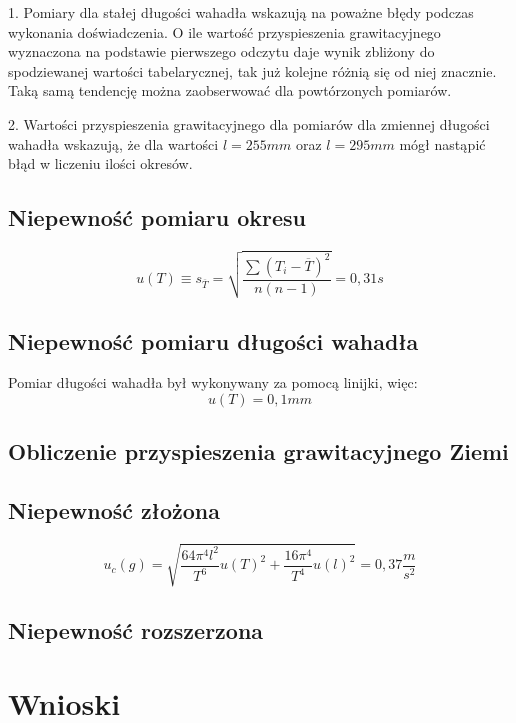 \documentclass[a4paper,10pt,twoside]{article}
\begin{document}
1. Pomiary dla stałej długości wahadła wskazują na poważne błędy podczas wykonania doświadczenia. O ile wartość przyspieszenia grawitacyjnego wyznaczona na podstawie pierwszego odczytu daje wynik zbliżony do spodziewanej wartości tabelarycznej, tak już kolejne różnią się od niej znacznie. Taką samą tendencję można zaobserwować dla powtórzonych pomiarów.

2. Wartości przyspieszenia grawitacyjnego dla pomiarów dla zmiennej długości wahadła wskazują, że dla wartości $l=255mm$ oraz $l=295mm$ mógł nastąpić błąd w liczeniu ilości okresów.

\subsection{Niepewność pomiaru okresu}
$$u(T)\equiv s_{\overline{T}} = \sqrt{\frac{\sum{(T_i-\overline{T})^2}}{n(n-1)}} = 0,31s $$
\subsection{Niepewność pomiaru długości wahadła}
Pomiar długości wahadła był wykonywany za pomocą linijki, więc:
$$u(T)=0,1mm$$
\subsection{Obliczenie przyspieszenia grawitacyjnego Ziemi}
\subsection{Niepewność złożona}
$$u_c(g)=\sqrt{\frac{64\pi^4 l^2}{T^6}u(T)^2+\frac{16\pi^4}{T^4}u(l)^2} =  0,37 \frac{m}{s^2}$$
\subsection{Niepewność rozszerzona}

\section{Wnioski}
\end{document}
